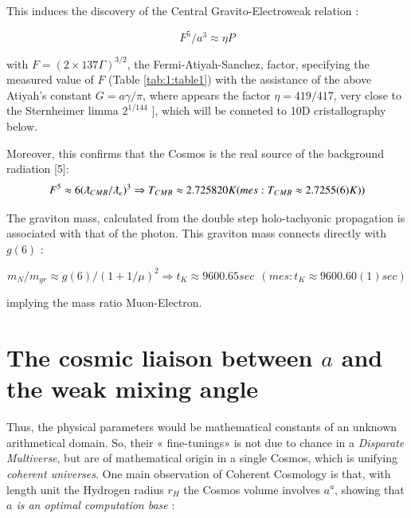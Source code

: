 \documentclass[a4paper,9pt]{article}
\begin{document}
This induces the discovery of the Central Gravito-Electroweak relation :

\begin{equation*}
F^5/a^3 \approx \eta P    
\end{equation*}{}
  

with  $F = (2\times 137 \Gamma)^{3/2}$, the Fermi-Atiyah-Sanchez, factor, specifying the measured value of  $F$ (Table \ref{tab:1:table1}) with the assistance of the above Atiyah's constant $G = a \gamma/ \pi$, where appears the factor $\eta = 419/417$, very close to the Sternheimer limma $2^{1/144}$ \cite{Sternheimer}], which will be conneted to 10D cristallography below.


Moreover, this confirms that the Cosmos is the real source of the background radiation [5]:
\begin{equation}
F^5  \approx 6(\lambdabar_{CMB}/\lambdabar_{e})^3 \Rightarrow  T_{CMB}  \approx  2.725820 K  (mes : T_{CMB}  \approx  2.7255(6) K)) 
\end{equation}


The graviton mass, calculated from the double step holo-tachyonic propagation is associated with that of the photon. This graviton mass connects directly with $g(6)$ :

\begin{equation}
m_N/m_{gr} \approx g(6)/(1+1/\mu)^2 \Rightarrow    t_K  \approx  9600.65 sec ~~(mes : t_K \approx 9600.60(1) sec)    
\end{equation}

implying the mass ratio Muon-Electron. 





   
   
   
   
   
   
   
   
   
   

\section{The cosmic liaison between $a$ and the weak mixing angle}

Thus, the physical parameters would be mathematical constants of an unknown arithmetical domain. So, their « fine-tunings» is not due to chance in a \textit {Disparate Multiverse}, but are of mathematical origin in a single Cosmos, which is unifying \textit {coherent universes}. One main observation of Coherent Cosmology is that, with length unit the Hydrogen radius $r_H$ the Cosmos volume involves $a^a$, showing that \textit{$a$ is an optimal computation base}  \cite{Sanchez}:
\end{document}
